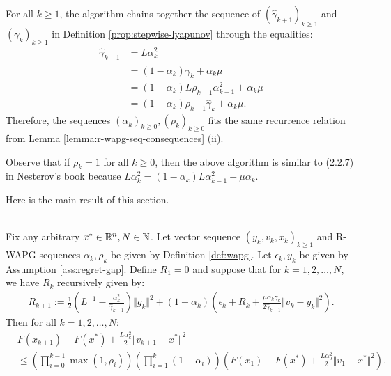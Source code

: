 \documentclass[12pt]{article}
\begin{document}
    \begin{remark}\label{remark:rwapg-def}
        For all $k \ge 1$, the algorithm chains together the sequence of $(\hat \gamma_{k+1})_{k \ge 1}$ and $(\gamma_k)_{k \ge 1}$ in Definition \ref{prop:stepwise-lyapunov} through the equalities:
        \begin{align*}
            \hat \gamma_{k + 1}
            &= L\alpha_k^2
            \\
            &= (1 - \alpha_k)\gamma_k + \alpha_k \mu
            \\
            &= (1 - \alpha_k)L\rho_{k - 1}\alpha_{k - 1}^2 + \alpha_k \mu
            \\
            &= (1 - \alpha_k)\rho_{k - 1}\hat \gamma_{k} + \alpha_k \mu.
        \end{align*}
        Therefore, the sequences $(\alpha_k)_{k \ge 0}, (\rho_k)_{k \ge 0}$ fits the same recurrence relation from Lemma \ref{lemma:r-wapg-seq-consequences} (ii).
        \par
        Observe that if $\rho_k = 1$ for all $k\ge 0$, then the above algorithm is similar to (2.2.7) in Nesterov's book \cite{nesterov_lectures_2018} because $L\alpha_k^{2} = (1 - \alpha_k)L\alpha_{k - 1}^2 + \mu \alpha_k$.
    \end{remark}
    Here is the main result of this section.
    \begin{proposition}\label{prop:wapg-convergence}\; \\
        Fix any arbitrary $x^* \in \mathbb R^n, N \in \mathbb N$.
        Let vector sequence $(y_k, v_{k}, x_{k})_{k \ge 1}$ and R-WAPG sequences $\alpha_k, \rho_k$ be given by Definition \ref{def:wapg}.
        Let $\epsilon_k, y_k$ be given by Assumption \ref{ass:regret-gap}.
        Define $R_1 = 0$ and suppose that for $k = 1, 2, \ldots, N$, we have $R_k$ recursively given by:
        \begin{align*}
            R_{k + 1}
            :=
            \frac{1}{2}\left(
                L^{-1} - \frac{\alpha_k^2}{\hat \gamma_{k + 1}}
            \right)\Vert g_k\Vert^2
            +
            (1 - \alpha_k)
            \left(
                \epsilon_k + R_k +
                \frac{\mu\alpha_k\gamma_k}{2\hat \gamma_{k + 1}}
                \Vert v_k - y_k\Vert^2
            \right).
        \end{align*}
        Then for all $k = 1, 2, \ldots, N$:
        \begin{align*}
            & F(x_{k + 1}) - F(x^*) + \frac{L \alpha_k^2}{2}\Vert v_{k + 1} - x^*\Vert^2
            \\
            &\le
            \left(
                \prod_{i = 0}^{k - 1} \max(1, \rho_{i})
            \right)
            \left(
                \prod_{i = 1}^{k} \left(1  - \alpha_i\right)
            \right)
            \left(
                F(x_1) - F(x^*) + \frac{L\alpha_0^2}{2}\Vert v_1 - x^*\Vert^2
            \right).
        \end{align*}
    \end{proposition}
\end{document}
